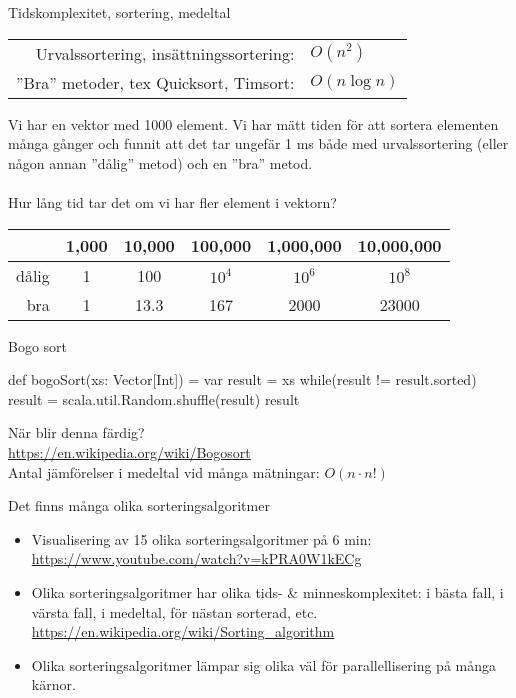 \begin{Slide}{Tidskomplexitet, sortering, medeltal}
\begin{tabular}{rl}
Urvalssortering, insättningssortering: & $O(n^2)$ \\
''Bra'' metoder, tex Quicksort, Timsort:  & $O(n\log n)$
\end{tabular}

\vspace{1em}\SlideFontSmall\noindent
Vi har en vektor med 1000 element. Vi har mätt tiden för att sortera elementen många gånger och funnit att det tar ungefär 1 ms både med urvalssortering (eller någon annan ''dålig'' metod) och en ''bra'' metod. \\~\\ Hur lång tid tar det om vi har fler element i vektorn?

\vspace{1em}
\begin{tabular}{rccccc}
       & 1,000 & 10,000 & 100,000 & 1,000,000 & 10,000,000 \\ \hline
dålig  & 1     & 100    & $10^4$  & $10^6$   & $10^8$ \\
bra    & 1     & 13.3   & 167     & 2000     & 23000
\end{tabular}
\end{Slide}

\begin{Slide}{Bogo sort}
\begin{Code}
def bogoSort(xs: Vector[Int]) = {
  var result = xs
  while(result != result.sorted) {
    result = scala.util.Random.shuffle(result)
  }
  result
}
\end{Code}
När blir denna färdig? \pause \\
\url{https://en.wikipedia.org/wiki/Bogosort}\\
Antal jämförelser i medeltal vid många mätningar: $ O(n \cdot n!) $
\end{Slide}





\begin{Slide}{Det finns många olika sorteringsalgoritmer}
\begin{itemize}
\item Visualisering av 15 olika sorteringsalgoritmer på 6 min:\\{\SlideFontSmall\url{https://www.youtube.com/watch?v=kPRA0W1kECg}}
\item Olika sorteringsalgoritmer har olika tids- \& minneskomplexitet: i bästa fall, i värsta fall, i medeltal, för nästan sorterad, etc.
\\{\SlideFontSmall\url{https://en.wikipedia.org/wiki/Sorting_algorithm}}
\item Olika sorteringsalgoritmer lämpar sig olika väl för parallellisering på många kärnor.
\end{itemize}
\end{Slide}




